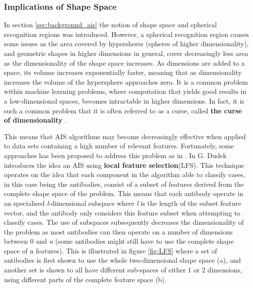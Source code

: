 \subsubsection{Implications of Shape Space}
In section \ref{sec:background_ais} the notion of shape space and spherical recognition regions was introduced. However, a spherical recognition region causes some issues as the area covered by hypersheres (spheres of higher dimensionality), and geometric shapes in higher dimensions in general, cover decreasingly less area as the dimensionality of the shape space increases. As dimensions are added to a space, its volume increases exponentially faster, meaning that as dimensionality increases the volume of the hypersphere approaches zero. It is a common problem within machine learning problems, where computation that yields good results in a low-dimensional spaces, becomes intractable in higher dimensions. In fact, it is such a common problem that it is often referred to as a curse, called \textbf{the curse of dimensionality} \cite{AIS:representation-in-ais,AIS:LFS}. 

This means that AIS algorithms may become decreasingly effective when applied to data sets containing a high number of relevant features. Fortunately, some approaches has been proposed to address this problem as in \cite{AIS:representation-in-ais, AIS:LFS}. In  \cite{AIS:LFS} G. Dudek introduces the idea an AIS using \textbf{local feature selection}(LFS). This technique operates on the idea that each component in the algorithm able to classify cases, in this case being the antibodies, consist of a subset of features derived from the complete shape space of the problem. This means that each antibody operate in an specialised \textit{l}-dimensional subspace where \textit{l} is the length of the subset feature vector, and the antibody only considers this feature subset when attempting to classify cases. The use of subspaces subsequently decreases the dimensionality of the problem as most antibodies can then operate on a number of dimensions between 0 and \textit{n} (some antibodies might still have to use the complete shape space of n features). This is illustrated in figure \ref{fig:LFS} where a set of antibodies is first shown to use the whole two-dimensional shape space (a), and another set is shown to all have different sub-spaces of either 1 or 2 dimensions, using different parts of the complete feature space (b).

